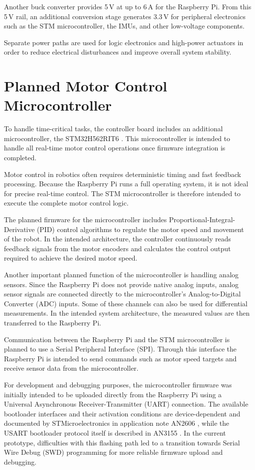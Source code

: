 \documentclass[conference]{IEEEtran}
\begin{document}
	Another buck converter provides 5\,V at up to 6\,A for the Raspberry Pi. From this 5\,V rail, an additional conversion stage generates 3.3\,V for peripheral electronics such as the STM microcontroller, the IMUs, and other low-voltage components.
	
	Separate power paths are used for logic electronics and high-power actuators in order to reduce electrical disturbances and improve overall system stability.
	
	\section{Planned Motor Control Microcontroller}
	
	To handle time-critical tasks, the controller board includes an additional microcontroller, the STM32H562RIT6 \cite{b6}. This microcontroller is intended to handle all real-time motor control operations once firmware integration is completed.
	
	Motor control in robotics often requires deterministic timing and fast feedback processing. Because the Raspberry Pi runs a full operating system, it is not ideal for precise real-time control. The STM microcontroller is therefore intended to execute the complete motor control logic.
	
	The planned firmware for the microcontroller includes Proportional-Integral-Derivative (PID) control algorithms to regulate the motor speed and movement of the robot. In the intended architecture, the controller continuously reads feedback signals from the motor encoders and calculates the control output required to achieve the desired motor speed.
	
	Another important planned function of the microcontroller is handling analog sensors. Since the Raspberry Pi does not provide native analog inputs, analog sensor signals are connected directly to the microcontroller's Analog-to-Digital Converter (ADC) inputs. Some of these channels can also be used for differential measurements. In the intended system architecture, the measured values are then transferred to the Raspberry Pi.
	
	Communication between the Raspberry Pi and the STM microcontroller is planned to use a Serial Peripheral Interface (SPI). Through this interface the Raspberry Pi is intended to send commands such as motor speed targets and receive sensor data from the microcontroller.
	
	For development and debugging purposes, the microcontroller firmware was initially intended to be uploaded directly from the Raspberry Pi using a Universal Asynchronous Receiver-Transmitter (UART) connection. The available bootloader interfaces and their activation conditions are device-dependent and documented by STMicroelectronics in application note AN2606 \cite{b8}, while the USART bootloader protocol itself is described in AN3155 \cite{b11}. In the current prototype, difficulties with this flashing path led to a transition towards Serial Wire Debug (SWD) programming for more reliable firmware upload and debugging.
	
\end{document}
